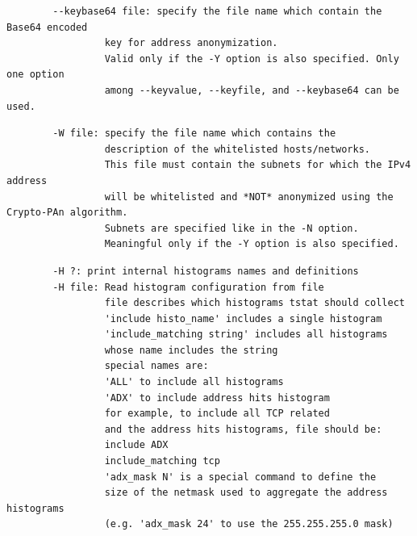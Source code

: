 \documentclass[11pt]{article}
\begin{document}
\begin{small}\begin{verbatim}
        --keybase64 file: specify the file name which contain the Base64 encoded
                 key for address anonymization.                                 
                 Valid only if the -Y option is also specified. Only one option 
                 among --keyvalue, --keyfile, and --keybase64 can be used.
\end{verbatim}\end{small} \noindent
\begin{small}\begin{verbatim}
        -W file: specify the file name which contains the
                 description of the whitelisted hosts/networks.
                 This file must contain the subnets for which the IPv4 address
                 will be whitelisted and *NOT* anonymized using the Crypto-PAn algorithm.
                 Subnets are specified like in the -N option.                            
                 Meaningful only if the -Y option is also specified.
\end{verbatim}\end{small} \noindent
\begin{small}\begin{verbatim}
        -H ?: print internal histograms names and definitions
        -H file: Read histogram configuration from file
                 file describes which histograms tstat should collect
                 'include histo_name' includes a single histogram
                 'include_matching string' includes all histograms
                 whose name includes the string
                 special names are:
                 'ALL' to include all histograms
                 'ADX' to include address hits histogram
                 for example, to include all TCP related
                 and the address hits histograms, file should be:
                 include ADX
                 include_matching tcp
                 'adx_mask N' is a special command to define the 
                 size of the netmask used to aggregate the address histograms
                 (e.g. 'adx_mask 24' to use the 255.255.255.0 mask)
\end{verbatim}\end{small} \noindent
\end{document}
